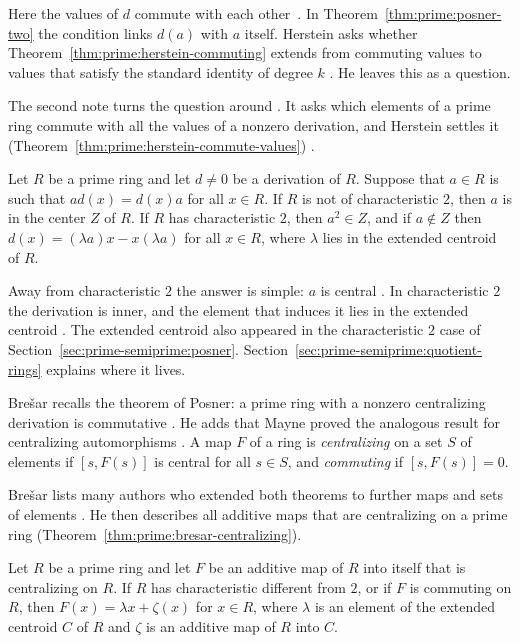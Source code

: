 Here the values of $d$ commute with each other~\cite[p.~370]{Herstein1978}. In
Theorem~\ref{thm:prime:posner-two} the condition links $d(a)$ with $a$ itself.
Herstein asks whether Theorem~\ref{thm:prime:herstein-commuting} extends from
commuting values to values that satisfy the standard identity of degree $k$
\cite[p.~370]{Herstein1978}. He leaves this as a question.

The second note turns the question around \cite[p.~509]{Herstein1979}. It asks
which elements of a prime ring commute with all the values of a nonzero
derivation, and Herstein settles it
(Theorem~\ref{thm:prime:herstein-commute-values}) \cite[p.~509]{Herstein1979}.

\begin{theorem}\label{thm:prime:herstein-commute-values}
Let $R$ be a prime ring and let $d\neq 0$ be a derivation of $R$. Suppose that
$a\in R$ is such that $ad(x)=d(x)a$ for all $x\in R$. If $R$ is not of
characteristic $2$, then $a$ is in the center $Z$ of $R$. If $R$ has
characteristic $2$, then $a^2\in Z$, and if $a\notin Z$ then $d(x)=(\lambda
a)x-x(\lambda a)$ for all $x\in R$, where $\lambda$ lies in the extended centroid
of $R$.
\end{theorem}

Away from characteristic $2$ the answer is simple: $a$ is central
\cite[p.~509]{Herstein1979}. In characteristic $2$ the derivation is inner,
and the element that induces it lies in the extended centroid
\cite[p.~509]{Herstein1979}. The extended centroid also appeared in the
characteristic $2$ case of Section~\ref{sec:prime-semiprime:posner}.
Section~\ref{sec:prime-semiprime:quotient-rings} explains where it lives.

Bre\v{s}ar recalls the theorem of Posner: a prime ring with a nonzero
centralizing derivation is commutative \cite[p.~385]{Bresar1993}. He adds that
Mayne proved the analogous result for centralizing automorphisms
\cite[p.~113]{Mayne1976Centralizing}. A map $F$ of a
ring is \emph{centralizing} on a set $S$ of elements if $[s,F(s)]$ is central
for all $s\in S$, and \emph{commuting} if $[s,F(s)]=0$.

Bre\v{s}ar lists many authors who extended both theorems to further maps and
sets of elements \cite[p.~385]{Bresar1993}. He then describes all additive
maps that are centralizing on a prime ring
(Theorem~\ref{thm:prime:bresar-centralizing}).

\begin{theorem}\label{thm:prime:bresar-centralizing}
Let $R$ be a prime ring and let $F$ be an additive map of $R$ into itself that
is centralizing on $R$. If $R$ has characteristic different from $2$, or if $F$
is commuting on $R$, then $F(x)=\lambda x+\zeta(x)$ for $x\in R$, where $\lambda$
is an element of the extended centroid $C$ of $R$ and $\zeta$ is an additive map
of $R$ into $C$.
\end{theorem}

